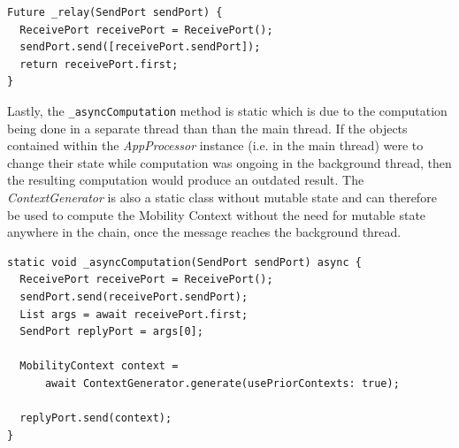 \begin{verbatim}
Future _relay(SendPort sendPort) {
  ReceivePort receivePort = ReceivePort();
  sendPort.send([receivePort.sendPort]);
  return receivePort.first;
}
\end{verbatim}

Lastly, the \verb|_asyncComputation| method is static which is due to the computation being done in a separate thread than than the main thread. If the objects contained within the \textit{AppProcessor} instance (i.e. in the main thread) were to change their state while computation was ongoing in the background thread, then the resulting computation would produce an outdated result. The \textit{ContextGenerator} is also a static class without mutable state and can therefore be used to compute the Mobility Context without the need for mutable state anywhere in the chain, once the message reaches the background thread.

\begin{verbatim}
static void _asyncComputation(SendPort sendPort) async {
  ReceivePort receivePort = ReceivePort();
  sendPort.send(receivePort.sendPort);
  List args = await receivePort.first;
  SendPort replyPort = args[0];

  MobilityContext context =
      await ContextGenerator.generate(usePriorContexts: true);

  replyPort.send(context);
}
\end{verbatim}

